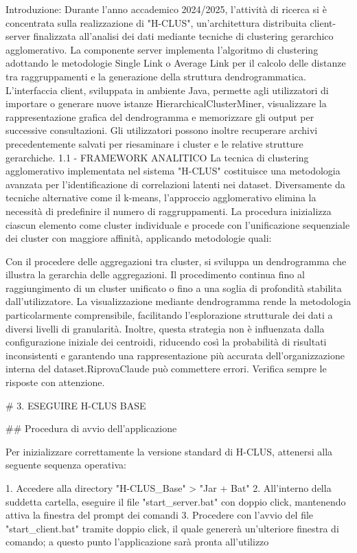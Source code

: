 Introduzione:
Durante l'anno accademico 2024/2025, l'attività di ricerca si è concentrata sulla realizzazione di "H-CLUS", un'architettura distribuita client-server finalizzata all'analisi dei dati mediante tecniche di clustering gerarchico agglomerativo. La componente server implementa l'algoritmo di clustering adottando le metodologie Single Link o Average Link per il calcolo delle distanze tra raggruppamenti e la generazione della struttura dendrogrammatica. L'interfaccia client, sviluppata in ambiente Java, permette agli utilizzatori di importare o generare nuove istanze HierarchicalClusterMiner, visualizzare la rappresentazione grafica del dendrogramma e memorizzare gli output per successive consultazioni. Gli utilizzatori possono inoltre recuperare archivi precedentemente salvati per riesaminare i cluster e le relative strutture gerarchiche.
1.1 - FRAMEWORK ANALITICO
La tecnica di clustering agglomerativo implementata nel sistema "H-CLUS" costituisce una metodologia avanzata per l'identificazione di correlazioni latenti nei dataset. Diversamente da tecniche alternative come il k-means, l'approccio agglomerativo elimina la necessità di predefinire il numero di raggruppamenti. La procedura inizializza ciascun elemento come cluster individuale e procede con l'unificazione sequenziale dei cluster con maggiore affinità, applicando metodologie quali:  



Con il procedere delle aggregazioni tra cluster, si sviluppa un dendrogramma che illustra la gerarchia delle aggregazioni. Il procedimento continua fino al raggiungimento di un cluster unificato o fino a una soglia di profondità stabilita dall'utilizzatore. La visualizzazione mediante dendrogramma rende la metodologia particolarmente comprensibile, facilitando l'esplorazione strutturale dei dati a diversi livelli di granularità. Inoltre, questa strategia non è influenzata dalla configurazione iniziale dei centroidi, riducendo così la probabilità di risultati inconsistenti e garantendo una rappresentazione più accurata dell'organizzazione interna del dataset.RiprovaClaude può commettere errori. Verifica sempre le risposte con attenzione.


# 3. ESEGUIRE H-CLUS BASE

## Procedura di avvio dell'applicazione

Per inizializzare correttamente la versione standard di H-CLUS, attenersi alla seguente sequenza operativa:

1. Accedere alla directory "H-CLUS_Base" > "Jar + Bat"
2. All'interno della suddetta cartella, eseguire il file "start_server.bat" con doppio click, mantenendo attiva la finestra del prompt dei comandi
3. Procedere con l'avvio del file "start_client.bat" tramite doppio click, il quale genererà un'ulteriore finestra di comando; a questo punto l'applicazione sarà pronta all'utilizzo

